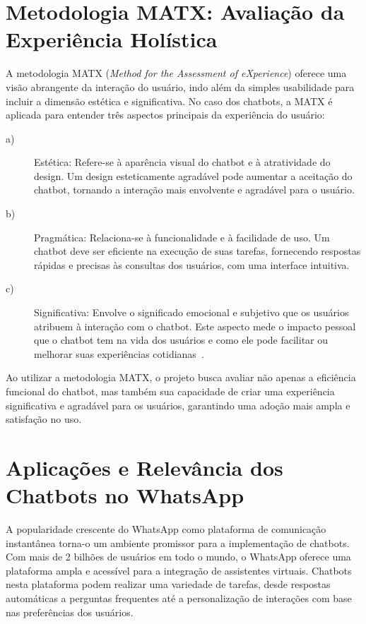 \section{Metodologia MATX: Avaliação da Experiência Holística}
A metodologia MATX (\textit{Method for the Assessment of eXperience}) oferece uma visão abrangente da interação do usuário, indo além da simples usabilidade para incluir a dimensão estética e significativa. No caso dos chatbots, a MATX é aplicada para entender três aspectos principais da experiência do usuário:
\begin{description}
    \item[a)] Estética: Refere-se à aparência visual do chatbot e à atratividade do design. Um design esteticamente agradável pode aumentar a aceitação do chatbot, tornando a interação mais envolvente e agradável para o usuário.
    \item[b)] Pragmática: Relaciona-se à funcionalidade e à facilidade de uso. Um chatbot deve ser eficiente na execução de suas tarefas, fornecendo respostas rápidas e precisas às consultas dos usuários, com uma interface intuitiva.
    \item[c)] Significativa: Envolve o significado emocional e subjetivo que os usuários atribuem à interação com o chatbot. Este aspecto mede o impacto pessoal que o chatbot tem na vida dos usuários e como ele pode facilitar ou melhorar suas experiências cotidianas~\cite{Valentim2014}.
\end{description}

Ao utilizar a metodologia MATX, o projeto busca avaliar não apenas a eficiência funcional do chatbot, mas também sua capacidade de criar uma experiência significativa e agradável para os usuários, garantindo uma adoção mais ampla e satisfação no uso.

\section{Aplicações e Relevância dos Chatbots no WhatsApp}
A popularidade crescente do WhatsApp como plataforma de comunicação instantânea torna-o um ambiente promissor para a implementação de chatbots. Com mais de 2 bilhões de usuários em todo o mundo, o WhatsApp oferece uma plataforma ampla e acessível para a integração de assistentes virtuais. Chatbots nesta plataforma podem realizar uma variedade de tarefas, desde respostas automáticas a perguntas frequentes até a personalização de interações com base nas preferências dos usuários.


